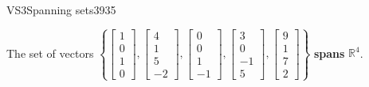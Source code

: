 \begin{exercise}{VS3}{Spanning sets}{3935}
\begin{exerciseAnswer}
 

 The set of vectors \(\left\{ \left[\begin{array}{c}
1 \\
0 \\
1 \\
0
\end{array}\right] , \left[\begin{array}{c}
4 \\
1 \\
5 \\
-2
\end{array}\right] , \left[\begin{array}{c}
0 \\
0 \\
1 \\
-1
\end{array}\right] , \left[\begin{array}{c}
3 \\
0 \\
-1 \\
5
\end{array}\right] , \left[\begin{array}{c}
9 \\
1 \\
7 \\
2
\end{array}\right] \right\}\) \textbf{spans} \(\mathbb{R}^4\). 

 \end{exerciseAnswer}
 \end{exercise}


